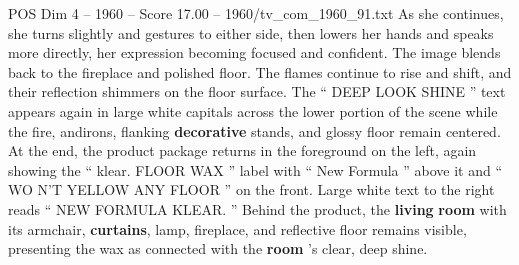\begin{textsample}{POS Dim 4 – 1960 – Score 17.00 – 1960/tv\_com\_1960\_91.txt}
As she continues, she turns slightly and gestures to either side, then lowers her hands and speaks more directly, her expression becoming focused and confident.
The image blends back to the fireplace and polished floor.
The flames continue to rise and shift, and their reflection shimmers on the floor surface.
The “ DEEP LOOK SHINE ” text appears again in large white capitals across the lower portion of the scene while the fire, andirons, flanking \textbf{decorative} stands, and glossy floor remain centered.
At the end, the product package returns in the foreground on the left, again showing the “ klear.
FLOOR WAX ” label with “ New Formula ” above it and “ WO N’T YELLOW ANY FLOOR ” on the front.
Large white text to the right reads “ NEW FORMULA KLEAR. ” Behind the product, the \textbf{living} \textbf{room} with its armchair, \textbf{curtains}, lamp, fireplace, and reflective floor remains visible, presenting the wax as connected with the \textbf{room} ’s clear, deep shine.

\end{textsample}
